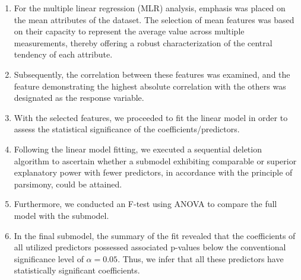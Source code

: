 \documentclass[conference]{IEEEtran}
\begin{document}
\begin{enumerate}
    \item For the multiple linear regression (MLR) analysis, emphasis was placed on the mean attributes of the dataset. The selection of mean features was based on their capacity to represent the average value across multiple measurements, thereby offering a robust characterization of the central tendency of each attribute.
    
    \item Subsequently, the correlation between these features was examined, and the feature demonstrating the highest absolute correlation with the others was designated as the response variable.
    
    \item With the selected features, we proceeded to fit the linear model in order to assess the statistical significance of the coefficients/predictors.
    
    \item Following the linear model fitting, we executed a sequential deletion algorithm to ascertain whether a submodel exhibiting comparable or superior explanatory power with fewer predictors, in accordance with the principle of parsimony, could be attained.

    \item Furthermore, we conducted an F-test using ANOVA to compare the full model with the submodel.
    
    \item In the final submodel, the summary of the fit revealed that the coefficients of all utilized predictors possessed associated p-values below the conventional significance level of \(\alpha = 0.05\). Thus, we infer that all these predictors have statistically significant coefficients.
    
\end{enumerate}
\end{document}
